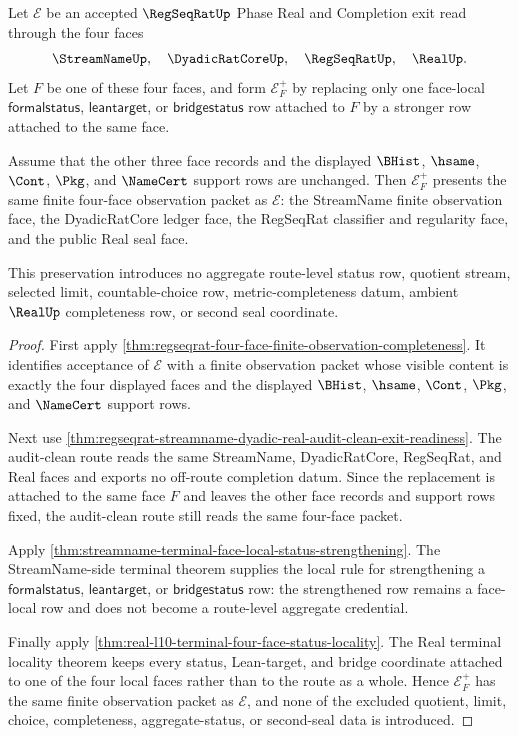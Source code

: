 \begin{theorem}
\label{thm:regseqrat-four-face-status-locality}
Let $\mathcal E$ be an accepted $\RegSeqRatUp$ Phase Real and Completion exit
read through the four faces
$$
\StreamNameUp,\quad \DyadicRatCoreUp,\quad \RegSeqRatUp,\quad \RealUp.
$$
Let $F$ be one of these four faces, and form $\mathcal E_F^+$ by replacing only
one face-local $\mathsf{formalstatus}$, $\mathsf{leantarget}$, or
$\mathsf{bridgestatus}$ row attached to $F$ by a stronger row attached to the
same face.

Assume that the other three face records and the displayed $\BHist$, $\hsame$,
$\Cont$, $\Pkg$, and $\NameCert$ support rows are unchanged. Then
$\mathcal E_F^+$ presents the same finite four-face observation packet as
$\mathcal E$: the StreamName finite observation face, the DyadicRatCore ledger
face, the RegSeqRat classifier and regularity face, and the public Real seal
face.

This preservation introduces no aggregate route-level status row, quotient
stream, selected limit, countable-choice row, metric-completeness datum,
ambient $\RealUp$ completeness row, or second seal coordinate.
\end{theorem}
\begin{proof}
First apply
\autoref{thm:regseqrat-four-face-finite-observation-completeness}. It
identifies acceptance of $\mathcal E$ with a finite observation packet whose
visible content is exactly the four displayed faces and the displayed
$\BHist$, $\hsame$, $\Cont$, $\Pkg$, and $\NameCert$ support rows.

Next use
\autoref{thm:regseqrat-streamname-dyadic-real-audit-clean-exit-readiness}. The
audit-clean route reads the same StreamName, DyadicRatCore, RegSeqRat, and Real
faces and exports no off-route completion datum. Since the replacement is
attached to the same face $F$ and leaves the other face records and support rows
fixed, the audit-clean route still reads the same four-face packet.

Apply \autoref{thm:streamname-terminal-face-local-status-strengthening}. The
StreamName-side terminal theorem supplies the local rule for strengthening a
$\mathsf{formalstatus}$, $\mathsf{leantarget}$, or $\mathsf{bridgestatus}$ row:
the strengthened row remains a face-local row and does not become a route-level
aggregate credential.

Finally apply \autoref{thm:real-l10-terminal-four-face-status-locality}. The
Real terminal locality theorem keeps every status, Lean-target, and bridge
coordinate attached to one of the four local faces rather than to the route as a
whole. Hence $\mathcal E_F^+$ has the same finite observation packet as
$\mathcal E$, and none of the excluded quotient, limit, choice, completeness,
aggregate-status, or second-seal data is introduced.
\end{proof}
